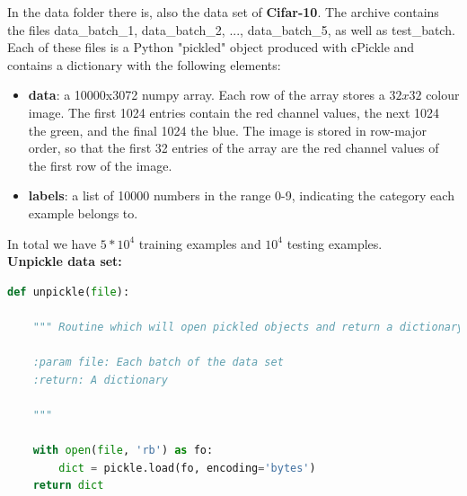 \documentclass[11pt]{article}
\begin{document}
In the data folder there is, also the data set of \textbf{Cifar-10}. The archive contains the files data\_batch\_1, data\_batch\_2, ..., data\_batch\_5, as well as test\_batch. Each of these files is a Python "pickled" object produced with cPickle and contains a dictionary with the following elements:

\begin{itemize}
\item \textbf{data}: a 10000x3072 numpy array. Each row of the array stores a $32x32$ colour image. The first 1024 entries contain the red channel values, the next 1024 the green, and the final 1024 the blue. The image is stored in row-major order, so that the first 32 entries of the array are the red channel values of the first row of the image.
\item \textbf{labels}: a list of 10000 numbers in the range 0-9, indicating the category each example belongs to.
\end{itemize} 

\noindent In total we have $5*10^4$ training examples and $10^4$ testing examples. \\


\noindent \textbf{Unpickle data set:}

\begin{lstlisting}[language = Python]
def unpickle(file):
    
    """ Routine which will open pickled objects and return a dictionary.
    
    :param file: Each batch of the data set
    :return: A dictionary
    
    """
    
    with open(file, 'rb') as fo:
        dict = pickle.load(fo, encoding='bytes')
    return dict
\end{lstlisting}
\end{document}
